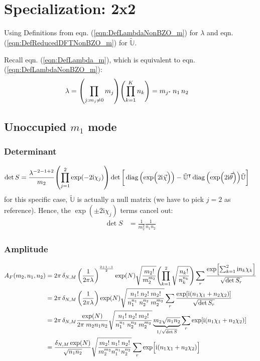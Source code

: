 \documentclass[
	english,
	a4paper,
	fontsize=10pt,
	parskip=half,
	titlepage=true,
	DIV=12,
	final
]{scrreprt}
\newcommand*{\transp}{\ensuremath{^\intercal}}
\newcommand*{\iunit}{\ensuremath{\mathrm{i}}}
\DeclareMathOperator{\diag}{diag}
\begin{document}
\section{Specialization: 2x2}
Using Definitions from eqn. (\ref{eqn:DefLambdaNonBZO_m}) for $\lambda$ and eqn. (\ref{eqn:DefReducedDFTNonBZO_m}) for $\tilde{\mathbb{U}}$.

Recall eqn. (\ref{eqn:DefLambda_m}), which is equivalent to eqn. (\ref{eqn:DefLambdaNonBZO_m}):
\begin{align*}
	\lambda
&=
	\qty( \prod_{j : m_j \neq 0} m_j )
	\qty( \prod_{k=1}^{K}   n_k )
=
	m_{j^*} \, n_1 \, n_2
\end{align*}

\subsection{Unoccupied $m_1$ mode}
\subsubsection{Determinant}
\begin{align}
	\det S
&=
	\frac{ \lambda^{-2 - 1 + 2} }{ m_2 }
	\qty( \prod_{j=1}^{2} \exp(-2\iunit \chi_j) )
	\det\qty[\bigg.
		\diag\qty(\exp(\Big.2\iunit\vec{\chi}))
		-
		\tilde{\mathbb{U}}\transp
		\diag\qty(\exp(2\iunit\vec{\theta}))
		\tilde{\mathbb{U}}
	]
\end{align}
for this specific case, $\tilde{\mathbb{U}}$ is actually a null matrix (we have to pick $j=2$ as reference). Hence, the 
$\exp(\pm 2\iunit \chi_j)$ terms cancel out:
\begin{align}
	\det S
&=
	\frac{1}{m_2^{2}}
	\frac{1}{n_1 n_2}
\end{align}

\subsubsection{Amplitude}
\begin{align}
	A_F(m_2, n_1, n_2)
&=
	2\pi \, \delta_{N,M} \, \qty(
		\frac{1}{2\pi\lambda}
	)^{\frac{2 + 1 - 1}{2}}
	\exp(N)
		\sqrt{\frac
			{ m_2! }
			{ m_2^{m_2} }
	}
	\qty( \prod_{k=1}^{2}
		\sqrt{\frac
			{ n_k! }
			{ n_k^{n_k} }
	})
	\sum_r
		\frac
		{\exp[ \sum_{k=1}^{2} \iunit n_k \chi_k]}
		{\sqrt{\det S_r}} \\
&=
	2\pi \, \delta_{N,M} \, \qty(
		\frac{1}{2\pi\lambda}
	)
	\exp(N)
		\sqrt{\frac
			{ n_1! \; n_2! \; m_2! }
			{ n_1^{n_1} \; n_2^{n_2} \; m_2^{m_2}}
	}
	\sum_r
		\frac
		{\exp[
			\iunit ( n_1 \chi_1 + n_2 \chi_2 )
		]}
		{\sqrt{\det S_r}}
	\\
&=
	2\pi \, \delta_{N,M}
	\frac
		{\exp(N)}
		{2\pi \; m_2 n_1 n_2}
	\sqrt{\frac
		{ n_1! \; n_2! \; m_2! }
		{ n_1^{n_1} \; n_2^{n_2} \; m_2^{m_2}}
	}
	\underbrace{m_2\sqrt{n_1 n_2}}_{1/\sqrt{\det S}}
	\sum_r
		\exp[
			\iunit ( n_1 \chi_1 + n_2 \chi_2 )
		] \\
&=
	\frac
		{ \delta_{N,M} \exp(N) }
		{  \sqrt{n_1 n_2} }
	\sqrt{\frac
		{ m_2! \; n_1! \; n_2! }
		{ m_2^{m_2} n_1^{n_1} n_2^{n_2} }
	}
	\sum_r
		\exp[ \Big.
			\iunit \qty(  
			n_1 \chi_1 + n_2 \chi_2)
		]
\end{align}
\end{document}
